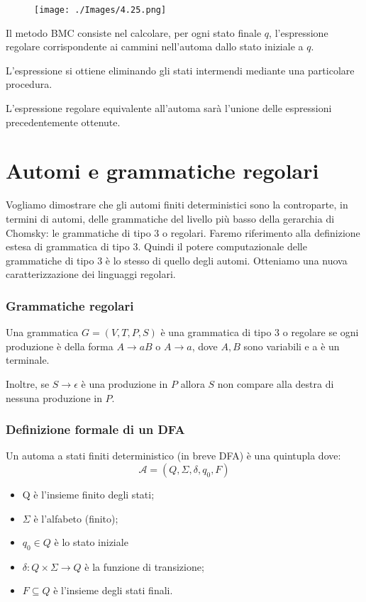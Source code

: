 \begin{figure}[hbpt!]
    \centering
    \texttt{[image: ./Images/4.25.png]}
\end{figure}
\FloatBarrier

Il metodo BMC consiste nel calcolare, per ogni stato finale $q$, l'espressione regolare corrispondente ai cammini nell'automa dallo stato iniziale a $q$.

L'espressione si ottiene eliminando gli stati intermendi mediante una particolare procedura.

L'espressione regolare equivalente all'automa sarà l'unione delle espressioni precedentemente ottenute.

\section{Automi e grammatiche regolari}
Vogliamo dimostrare che gli automi finiti deterministici sono
la controparte, in termini di automi, delle grammatiche del
livello più basso della gerarchia di Chomsky: le grammatiche
di tipo 3 o regolari.
Faremo riferimento alla definizione estesa di grammatica di
tipo 3.
Quindi il potere computazionale delle grammatiche di tipo 3 è
lo stesso di quello degli automi.
Otteniamo una nuova caratterizzazione dei linguaggi regolari.

\subsubsection{Grammatiche regolari}

Una grammatica $G=(V, T, P, S)$ è una grammatica di tipo 3 o regolare se ogni produzione è della forma $A \rightarrow a B$ o $A \rightarrow a$, dove $A, B$ sono variabili e a è un terminale.

Inoltre, se $S \rightarrow \epsilon$ è una produzione in $P$ allora $S$ non compare alla destra di nessuna produzione in $P$.

\subsubsection{Definizione formale di un DFA}

Un automa a stati finiti deterministico (in breve DFA) è una quintupla dove:
$$
\mathcal{A}=\left(Q, \Sigma, \delta, q_{0}, F\right)
$$
\begin{itemize}
    \item Q è l'insieme finito degli stati;
    \item $\Sigma$ è l'alfabeto (finito);
    \item $q_{0} \in Q$ è lo stato iniziale
    \item $\delta: Q \times \Sigma \rightarrow Q$ è la funzione di transizione;
    \item $F \subseteq Q$ è l'insieme degli stati finali.
\end{itemize}

